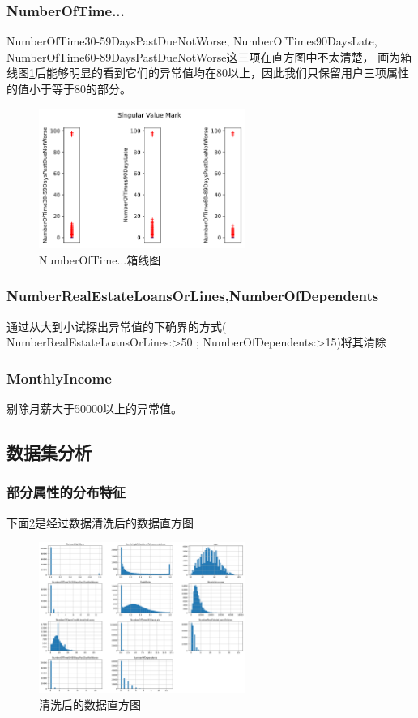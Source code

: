 \documentclass[UTF8,a4paper,10pt]{ctexart}
\begin{document}
\subsubsection{NumberOfTime...}
NumberOfTime30-59DaysPastDueNotWorse, NumberOfTimes90DaysLate, \\NumberOfTime60-89DaysPastDueNotWorse这三项在直方图中不太清楚，
画为箱线图\ref*{2}后能够明显的看到它们的异常值均在80以上，因此我们只保留用户三项属性的值小于等于80的部分。
\begin{figure}[htbp]
	\centering
	\includegraphics[width=0.6\textwidth]{number.png} %
	\caption{NumberOfTime...箱线图} %
	\label{2} %
\end{figure}
\subsubsection{NumberRealEstateLoansOrLines,NumberOfDependents}
通过从大到小试探出异常值的下确界的方式( NumberRealEstateLoansOrLines:>50 ; NumberOfDependents:>15)将其清除
\subsubsection{MonthlyIncome}
剔除月薪大于50000以上的异常值。
\subsection{数据集分析}
\subsubsection{部分属性的分布特征}
下面\ref*{3}是经过数据清洗后的数据直方图

\begin{figure}[htbp]
	\centering
	\includegraphics[width=0.6\textwidth]{zz.png} %
	\caption{清洗后的数据直方图} %
	\label{3} %
\end{figure}
\end{document}
